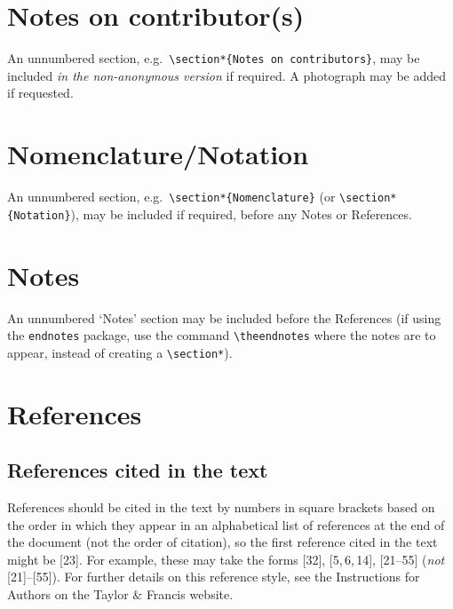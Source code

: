 \documentclass[]{interact}
\theoremstyle{plain}%
\theoremstyle{definition}
\theoremstyle{remark}
\begin{document}
\section*{Notes on contributor(s)}

An unnumbered section, e.g.\ \verb"\section*{Notes on contributors}", may be included \emph{in the non-anonymous version} if required. A photograph may be added if requested.


\section*{Nomenclature/Notation}

An unnumbered section, e.g.\ \verb"\section*{Nomenclature}" (or \verb"\section*{Notation}"), may be included if required, before any Notes or References.


\section*{Notes}

An unnumbered `Notes' section may be included before the References (if using the \verb"endnotes" package, use the command \verb"\theendnotes" where the notes are to appear, instead of creating a \verb"\section*").


\section{References}

\subsection{References cited in the text}

References should be cited in the text by numbers in square brackets based on the order in which they appear in an alphabetical list of references at the end of the document (not the order of citation), so the first reference cited in the text might be [23]. For example, these may take the forms [32], [5,\,6,\,14], [21--55] (\emph{not} [21]--[55]). For further details on this reference style, see the Instructions for Authors on the Taylor \& Francis website.
\end{document}
